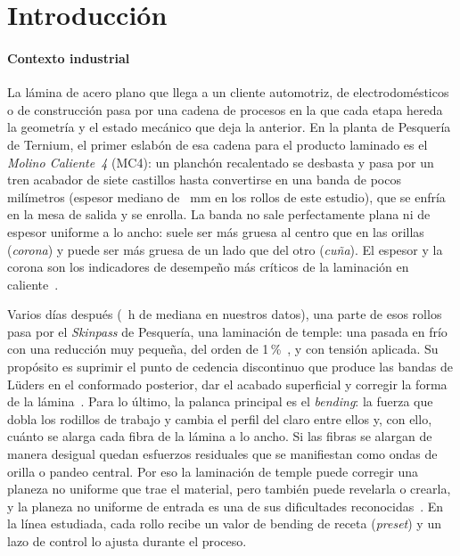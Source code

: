 \section{Introducción}
\label{sec:intro}

\paragraph{Contexto industrial}
La lámina de acero plano que llega a un cliente automotriz, de electrodomésticos o de construcción pasa por una
cadena de procesos en la que cada etapa hereda la geometría y el estado mecánico que deja la anterior. En la planta
de Pesquería de Ternium, el primer eslabón de esa cadena para el producto laminado es el \emph{Molino Caliente~4}
(MC4): un planchón recalentado se desbasta y pasa por un tren acabador de siete castillos hasta convertirse en una
banda de pocos milímetros (espesor mediano de \EspesorMediano{}~mm en los rollos de este estudio), que se enfría en la
mesa de salida y se enrolla. La banda no sale perfectamente plana ni de espesor uniforme a lo ancho: suele ser más
gruesa al centro que en las orillas (\emph{corona}) y puede ser más gruesa de un lado que del otro (\emph{cuña}). El
espesor y la corona son los indicadores de desempeño más críticos de la laminación en caliente~\cite{peng2014}.

Varios días después (\DesfaseMedianoH{}~h de mediana en nuestros datos), una parte de esos rollos pasa por el
\emph{Skinpass} de Pesquería, una laminación de temple: una pasada en frío con una reducción muy pequeña, del orden
de 1\,\%~\cite{kijima2008}, y con tensión aplicada. Su propósito es suprimir el punto de cedencia discontinuo que
produce las bandas de Lüders en el conformado posterior, dar el acabado superficial y corregir la forma de la
lámina~\cite{lenard2014}. Para lo último, la palanca principal es el \emph{bending}: la fuerza que dobla los rodillos de
trabajo y cambia el perfil del claro entre ellos y, con ello, cuánto se alarga cada fibra de la lámina a lo ancho. Si
las fibras se alargan de manera desigual quedan esfuerzos residuales que se manifiestan como ondas de orilla o
pandeo central. Por eso la laminación de temple puede corregir una planeza no uniforme que trae el material, pero
también puede revelarla o crearla, y la planeza no uniforme de entrada es una de sus dificultades
reconocidas~\cite{lenard2014}. En la línea estudiada, cada rollo recibe un valor de bending de receta (\emph{preset})
y un lazo de control lo ajusta durante el proceso.

